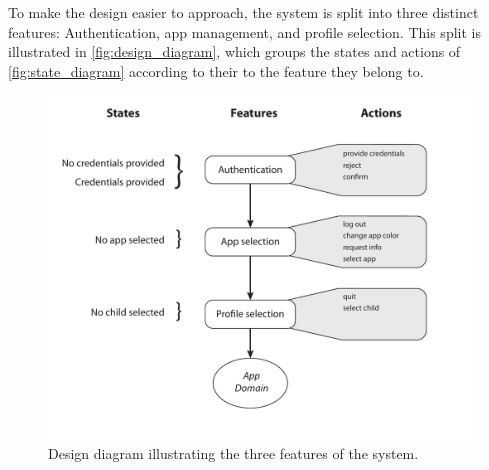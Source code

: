 To make the design easier to approach, the system is split into three distinct features: Authentication, app management, and profile selection. 
This split is illustrated in \autoref{fig:design_diagram}, which groups the states and actions of \autoref{fig:state_diagram} according to their to the feature they belong to. 

\begin{figure}[h]
	\centering
	\includegraphics[width=1\textwidth]{gfx/design_diagram.pdf}
	\caption{Design diagram illustrating the three features of the system.}
	\label{fig:design_diagram}
\end{figure}